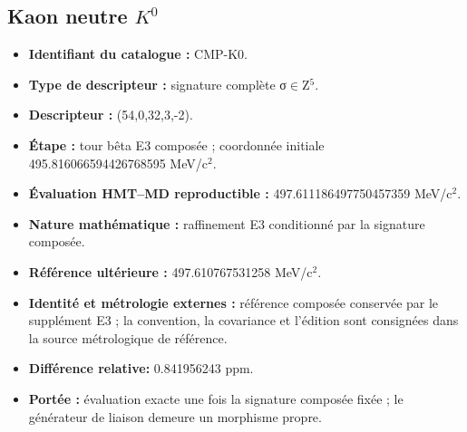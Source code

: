 \subsection{Kaon neutre \texorpdfstring{\(K^{0}\)}{K0}}
\begin{itemize}
\item \textbf{Identifiant du catalogue :} CMP-K0.
\item \textbf{Type de descripteur :} signature complète σ\(\in\)Z\({}^{5}\).
\item \textbf{Descripteur :} (54,0,32,3,-2).
\item \textbf{Étape :} tour bêta E3 composée ; coordonnée initiale 495.816066\allowbreak{}594426\allowbreak{}768595 MeV/c\({}^{2}\).
\item \textbf{Évaluation HMT--MD reproductible :} 497.611186\allowbreak{}497750\allowbreak{}457359 MeV/c\({}^{2}\).
\item \textbf{Nature mathématique :} raffinement E3 conditionné par la signature composée.
\item \textbf{Référence ultérieure :} 497.610767\allowbreak{}531258 MeV/c\({}^{2}\).
\item \textbf{Identité et métrologie externes :} référence composée conservée par le supplément E3 ; la convention, la covariance et l’édition sont consignées dans la source métrologique de référence.
\item \textbf{Différence relative:} 0.841956\allowbreak{}243 ppm.
\item \textbf{Portée :} évaluation exacte une fois la signature composée fixée ; le générateur de liaison demeure un morphisme propre.
\end{itemize}

